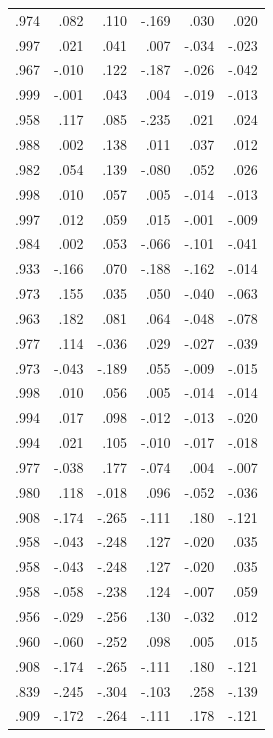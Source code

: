 \documentclass{mcmthesis}
\begin{document}
\begin{appendices}
\begin{table}[htbp]
\begin{tabular}{|r|r|r|r|r|r|}
    .974  & .082  & .110  & -.169 & .030  & .020 \\
    .997  & .021  & .041  & .007  & -.034 & -.023 \\
    .967  & -.010 & .122  & -.187 & -.026 & -.042 \\
    .999  & -.001 & .043  & .004  & -.019 & -.013 \\
    .958  & .117  & .085  & -.235 & .021  & .024 \\
    .988  & .002  & .138  & .011  & .037  & .012 \\
    .982  & .054  & .139  & -.080 & .052  & .026 \\
    .998  & .010  & .057  & .005  & -.014 & -.013 \\
    .997  & .012  & .059  & .015  & -.001 & -.009 \\
    .984  & .002  & .053  & -.066 & -.101 & -.041 \\
    .933  & -.166 & .070  & -.188 & -.162 & -.014 \\
    .973  & .155  & .035  & .050  & -.040 & -.063 \\
    .963  & .182  & .081  & .064  & -.048 & -.078 \\
    .977  & .114  & -.036 & .029  & -.027 & -.039 \\
    .973  & -.043 & -.189 & .055  & -.009 & -.015 \\
    .998  & .010  & .056  & .005  & -.014 & -.014 \\
    .994  & .017  & .098  & -.012 & -.013 & -.020 \\
    .994  & .021  & .105  & -.010 & -.017 & -.018 \\
    .977  & -.038 & .177  & -.074 & .004  & -.007 \\
    .980  & .118  & -.018 & .096  & -.052 & -.036 \\
    .908  & -.174 & -.265 & -.111 & .180  & -.121 \\
    .958  & -.043 & -.248 & .127  & -.020 & .035 \\
    .958  & -.043 & -.248 & .127  & -.020 & .035 \\
    .958  & -.058 & -.238 & .124  & -.007 & .059 \\
    .956  & -.029 & -.256 & .130  & -.032 & .012 \\
    .960  & -.060 & -.252 & .098  & .005  & .015 \\
    .908  & -.174 & -.265 & -.111 & .180  & -.121 \\
    .839  & -.245 & -.304 & -.103 & .258  & -.139 \\
    .909  & -.172 & -.264 & -.111 & .178  & -.121 \\

\end{tabular}
\end{table}
\end{appendices}
\end{document}
